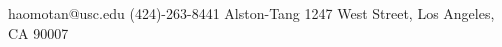 \contact
{haomotan@usc.edu}
{(424)-263-8441}
{Alston-Tang}
{}
{1247 West  Street, Los Angeles, CA 90007}
